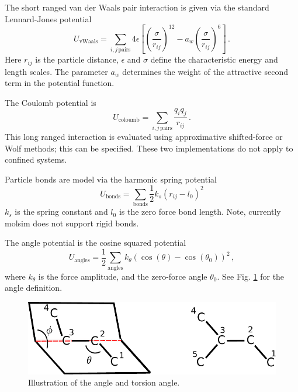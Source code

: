 \documentclass[11pt]{article}
\begin{document}
The short ranged van der Waals pair interaction is given via the standard
Lennard-Jones potential
\begin{equation}
  U_\mathrm{vWaals} =  \sum_{i,j \, \mathrm{pairs}}
  4\epsilon\left[\left(\frac{\sigma}{r_{ij}}\right)^{12} - a_w
    \left(\frac{\sigma}{r_{ij}}\right)^{6}\right] \, .
\end{equation}
Here $r_{ij}$ is the particle distance, $\epsilon$ and $\sigma$ define the
characteristic energy and length scales. The parameter $a_w$ determines the
weight of the attractive second term in the potential function.

The Coulomb potential is 
\begin{equation}
  U_{\mathrm{coloumb}} = \sum_{i,j \, \mathrm{pairs}}\frac{q_iq_j}{r_{ij}} \, .
\end{equation}
This long ranged interaction is evaluated using approximative shifted-force or
Wolf methods; this can be specified. These two implementations do not apply to
confined systems.

Particle bonds are model via the harmonic spring potential
\begin{equation}
  U_{\mathrm{bonds}} =\sum_{\mathrm{bonds}} \frac{1}{2} k_{s}(r_{ij} - l_0)^2
\end{equation}
$k_s$ is the spring constant and $l_0$ is the zero force bond length. Note,
currently \textsf{molsim} does not support rigid bonds. 

The angle potential is the cosine squared potential
\begin{equation}
  U_{\mathrm{angles}}=\frac{1}{2}\sum_{\mathrm{angles}} k_{\theta} (\cos(\theta) - \cos(\theta_0))^2 \, ,
\end{equation}
where $k_\theta$ is the force amplitude, and the zero-force angle
$\theta_0$. See Fig. \ref{fig:torsion} for the angle definition.

\begin{figure}[h]
  \begin{center}
    \includegraphics[scale=.7]{diheadral.pdf}
  \caption{
    \label{fig:torsion}
    Illustration of the angle and torsion angle.
  }
  \end{center}
\end{figure}
\end{document}

